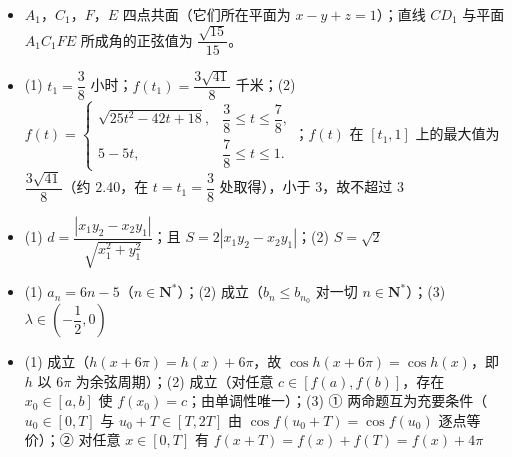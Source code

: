 \begin{itemize}[leftmargin=2.6em]
  \item[\textbf{19.}] \(A_{1}\)，\(C_{1}\)，\(F\)，\(E\) 四点共面（它们所在平面为 \(x-y+z=1\)）；直线 \(CD_{1}\) 与平面 \(A_{1}C_{1}FE\) 所成角的正弦值为 \(\dfrac{\sqrt{15}}{15}\)。
  \item[\textbf{20.}] (1) \(t_{1}=\dfrac{3}{8}\) 小时；\(f(t_{1})=\dfrac{3\sqrt{41}}{8}\) 千米；(2) $f(t)=\begin{cases}\sqrt{25t^{2}-42t+18}, & \dfrac{3}{8}\leqslant t\leqslant\dfrac{7}{8},\\ 5-5t, & \dfrac{7}{8}\leqslant t\leqslant1.\end{cases}$；\(f(t)\) 在 \([t_{1},1]\) 上的最大值为 \(\dfrac{3\sqrt{41}}{8}\)（约 \(2.40\)，在 \(t=t_{1}=\dfrac{3}{8}\) 处取得），小于 \(3\)，故不超过 3
  \item[\textbf{21.}] (1) \(d=\dfrac{|x_{1}y_{2}-x_{2}y_{1}|}{\sqrt{x_{1}^{2}+y_{1}^{2}}}\)；且 \(S=2|x_{1}y_{2}-x_{2}y_{1}|\)；(2) \(S=\sqrt{2}\)
  \item[\textbf{22.}] (1) \(a_{n}=6n-5\)（\(n\in\mathbf{N}^{\ast}\)）；(2) 成立（\(b_{n}\leqslant b_{n_{0}}\) 对一切 \(n\in\mathbf{N}^{\ast}\)）；(3) \(\lambda\in\left(-\dfrac{1}{2},0\right)\)
  \item[\textbf{23.}] (1) 成立（\(h(x+6\pi)=h(x)+6\pi\)，故 \(\cos h(x+6\pi)=\cos h(x)\)，即 \(h\) 以 \(6\pi\) 为余弦周期）；(2) 成立（对任意 \(c\in[f(a),f(b)]\)，存在 \(x_{0}\in[a,b]\) 使 \(f(x_{0})=c\)；由单调性唯一）；(3) ① 两命题互为充要条件（\(u_{0}\in[0,T]\) 与 \(u_{0}+T\in[T,2T]\) 由 \(\cos f(u_{0}+T)=\cos f(u_{0})\) 逐点等价）；② 对任意 \(x\in[0,T]\) 有 \(f(x+T)=f(x)+f(T)=f(x)+4\pi\)
\end{itemize}
